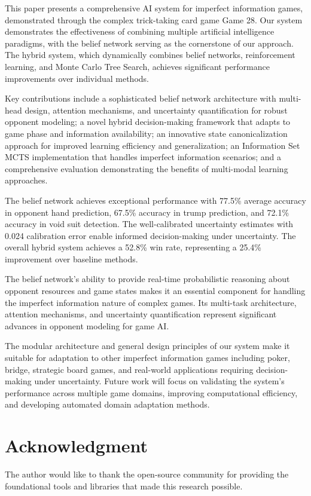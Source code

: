 \documentclass[conference]{IEEEtran}
\begin{document}
This paper presents a comprehensive AI system for imperfect information games, demonstrated through the complex trick-taking card game Game 28. Our system demonstrates the effectiveness of combining multiple artificial intelligence paradigms, with the belief network serving as the cornerstone of our approach. The hybrid system, which dynamically combines belief networks, reinforcement learning, and Monte Carlo Tree Search, achieves significant performance improvements over individual methods.

Key contributions include a sophisticated belief network architecture with multi-head design, attention mechanisms, and uncertainty quantification for robust opponent modeling; a novel hybrid decision-making framework that adapts to game phase and information availability; an innovative state canonicalization approach for improved learning efficiency and generalization; an Information Set MCTS implementation that handles imperfect information scenarios; and a comprehensive evaluation demonstrating the benefits of multi-modal learning approaches.

The belief network achieves exceptional performance with 77.5\% average accuracy in opponent hand prediction, 67.5\% accuracy in trump prediction, and 72.1\% accuracy in void suit detection. The well-calibrated uncertainty estimates with 0.024 calibration error enable informed decision-making under uncertainty. The overall hybrid system achieves a 52.8\% win rate, representing a 25.4\% improvement over baseline methods.

The belief network's ability to provide real-time probabilistic reasoning about opponent resources and game states makes it an essential component for handling the imperfect information nature of complex games. Its multi-task architecture, attention mechanisms, and uncertainty quantification represent significant advances in opponent modeling for game AI.

The modular architecture and general design principles of our system make it suitable for adaptation to other imperfect information games including poker, bridge, strategic board games, and real-world applications requiring decision-making under uncertainty. Future work will focus on validating the system's performance across multiple game domains, improving computational efficiency, and developing automated domain adaptation methods.

\section*{Acknowledgment}
The author would like to thank the open-source community for providing the foundational tools and libraries that made this research possible.
\end{document}
